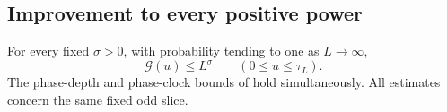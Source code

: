 \subsection{Improvement to every positive power}

\begin{theorem}
\label{thm:stopped-geometry}
For every fixed \(\sigma>0\), with probability tending to one as
\(L\to\infty\),
\begin{equation}
 \mathcal G(u)\le L^\sigma\qquad(0\le u\le\tau_L).
 \label{odd:all-power-geometry}
\end{equation}
The phase-depth and phase-clock bounds of  hold
simultaneously.  All estimates concern the same fixed odd slice.
\end{theorem}


